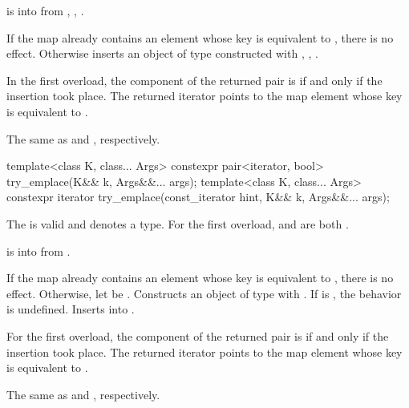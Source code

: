 \begin{itemdescr}
\pnum
\expects
{} is  into 
from , ,
.

\pnum
\effects
If the map already contains an element
whose key is equivalent to ,
there is no effect.
Otherwise inserts an object of type 
constructed with , ,
.

\pnum
\returns
In the first overload,
the  component of the returned pair is 
if and only if the insertion took place.
The returned iterator points to the map element
whose key is equivalent to .

\pnum
\complexity
The same as  and ,
respectively.
\end{itemdescr}

%
\begin{itemdecl}
template<class K, class... Args>
  constexpr pair<iterator, bool> try_emplace(K&& k, Args&&... args);
template<class K, class... Args>
  constexpr iterator try_emplace(const_iterator hint, K&& k, Args&&... args);
\end{itemdecl}

\begin{itemdescr}
\pnum
\constraints
The  
is valid and denotes a type.
For the first overload,
 and
are both .

\pnum
\expects
{} is  into  from
.

\pnum
\effects
If the map already contains an element whose key is equivalent to ,
there is no effect.
Otherwise, let  be .
Constructs an object  of type  with
.\linebreak
If  is ,
the behavior is undefined.
Inserts  into .

\pnum
\returns
For the first overload,
the  component of the returned pair is 
if and only if the insertion took place.
The returned iterator points to the map element
whose key is equivalent to .

\pnum
\complexity
The same as  and , respectively.
\end{itemdescr}

